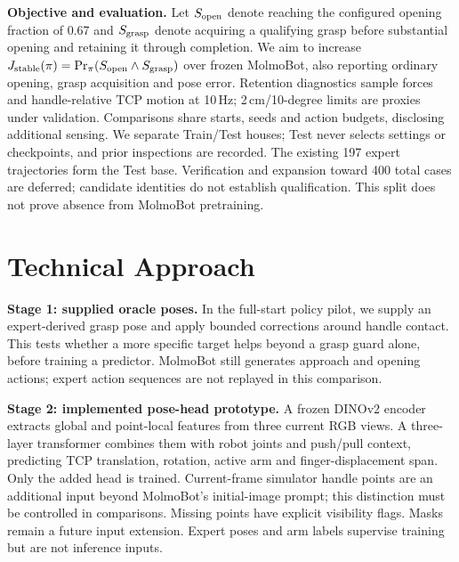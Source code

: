 \documentclass{article}
\begin{document}
\textbf{Objective and evaluation.} Let $S_{\rm open}$ denote reaching the
configured opening fraction of 0.67 and $S_{\rm grasp}$ denote acquiring a
qualifying grasp before substantial opening and retaining it through completion.
We aim to increase $J_{\rm stable}(\pi)=\Pr_\pi(S_{\rm open}\land S_{\rm grasp})$
over frozen MolmoBot, also reporting ordinary opening, grasp acquisition and
pose error. Retention diagnostics sample forces and handle-relative TCP motion
at 10\,Hz; 2\,cm/10-degree limits are proxies under validation. Comparisons
share starts, seeds and action budgets, disclosing additional sensing.
We separate Train/Test houses; Test never selects settings or checkpoints, and
prior inspections are recorded. The existing 197 expert trajectories form the
Test base. Verification and expansion toward 400 total cases are deferred;
candidate identities do not establish qualification. This split does not prove
absence from MolmoBot pretraining.

\section{Technical Approach}
\label{sec:method}
\textbf{Stage 1: supplied oracle poses.} In the full-start policy pilot, we supply an expert-derived
grasp pose and apply bounded corrections around handle contact. This tests
whether a more specific target helps beyond a grasp guard alone, before
training a predictor. MolmoBot still generates approach and opening actions;
expert action sequences are not replayed in this comparison.

\textbf{Stage 2: implemented pose-head prototype.} A frozen DINOv2 encoder
extracts global and point-local features from three current RGB views. A
three-layer transformer combines them with robot joints and push/pull context,
predicting TCP translation, rotation, active arm and finger-displacement span.
Only the added head is trained. Current-frame simulator handle points are an
additional input beyond MolmoBot's initial-image prompt; this distinction must
be controlled in comparisons. Missing points have explicit visibility flags.
Masks remain a future input extension. Expert poses and arm labels supervise
training but are not inference inputs.
\end{document}
